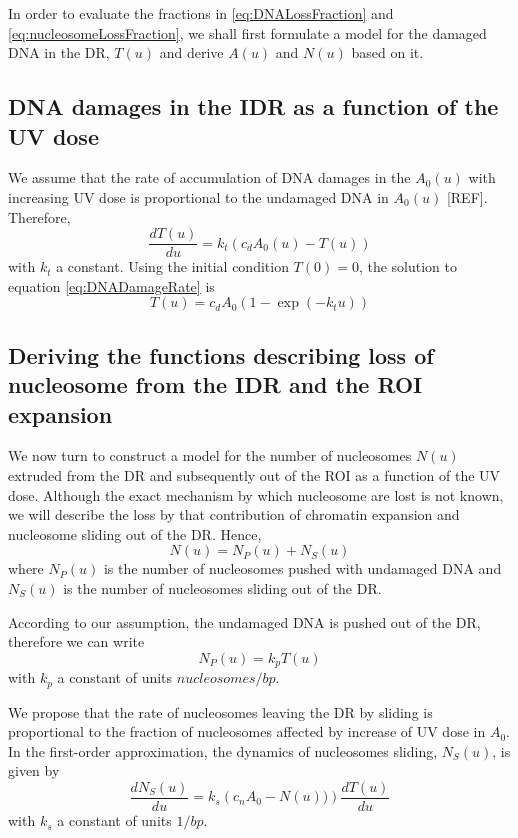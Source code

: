 \documentclass[12pt]{article}
\begin{document}
	In order to evaluate the fractions in \eqref{eq:DNALossFraction} and \eqref{eq:nucleosomeLossFraction}, we shall first formulate a model for the damaged DNA in the DR, $T(u)$ and derive $A(u)$ and $N(u)$ based on it.
	
	\subsection{DNA damages in the IDR as a function of the UV dose}\label{subsection:AccumulationOfDNADamagesInTheIDR}
	We assume that the rate of accumulation of DNA damages in the
	$A_0(u)$ with increasing UV dose is proportional to the undamaged DNA in $A_0(u)$ [REF]. Therefore,	
	\begin{equation}\label{eq:DNADamageRate}
	\frac{dT(u)}{du} = k_t(c_dA_0(u) - T(u))
	\end{equation}	
	with $k_t$ a constant. Using the initial condition $T(0) = 0$, the solution to equation \eqref{eq:DNADamageRate} is
	\begin{equation}\label{eq:DNADamagedIDR}
	T(u) = c_dA_0(1-\exp(-k_tu))
	\end{equation}
	
	\subsection{Deriving the functions describing loss of nucleosome from the IDR and the ROI expansion}
	We now turn to construct a model for the number of nucleosomes $N(u)$
	extruded from the DR and subsequently out of the ROI as a function of the UV dose. Although the exact mechanism by which nucleosome are lost is not known, we will describe the loss by that contribution of chromatin expansion and nucleosome sliding out of the DR. Hence,
	\begin{equation}\label{eq:nucleosomesAsSumDR}
	N(u)=N_P(u)+N_S(u)
	\end{equation}
	where $N_P(u)$ is the number of nucleosomes pushed with undamaged DNA and $N_S(u)$ is the number of nucleosomes sliding out of the DR.
	
	According to our assumption, the undamaged DNA is pushed out of the DR, therefore we can write
	\begin{equation}\label{eq:nucleosomePushDR}
	N_P(u) = k_pT(u)
	\end{equation}	
	with $k_p$ a constant of units $nucleosomes/bp $. 
	
	We propose that the rate of nucleosomes leaving the DR by sliding is proportional to the fraction of nucleosomes affected by increase of UV dose in $A_0$. In the first-order approximation, the dynamics of nucleosomes sliding, $N_S(u)$, is given by
	\begin{equation}\label{eq:nucleosomeSlideRate}
	\frac{dN_S(u)}{du} = k_s\left( c_nA_0-N(u))\right)\frac{dT(u)}{du}	
	\end{equation}
	with $k_s$ a constant of units $1/bp$. 
	
\end{document}
